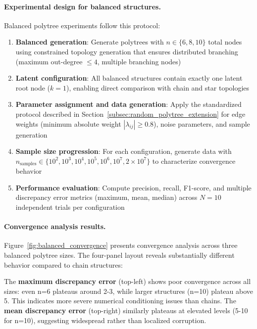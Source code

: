 \documentclass[11pt,a4paper]{article}
\numberwithin{equation}{section}
\begin{document}
\paragraph{Experimental design for balanced structures.} Balanced polytree experiments follow this protocol:

\begin{enumerate}[label=(\arabic*)]
\item \textbf{Balanced generation}: Generate polytrees with $n \in \{6, 8, 10\}$ total nodes using constrained topology generation that ensures distributed branching (maximum out-degree $\leq 4$, multiple branching nodes)

\item \textbf{Latent configuration}: All balanced structures contain exactly one latent root node ($k=1$), enabling direct comparison with chain and star topologies

\item \textbf{Parameter assignment and data generation}: Apply the standardized protocol described in Section~\ref{subsec:random_polytree_extension} for edge weights (minimum absolute weight $|\lambda_{ij}| \geq 0.8$), noise parameters, and sample generation

\item \textbf{Sample size progression}: For each configuration, generate data with $n_{\text{samples}} \in \{10^2, 10^3, 10^4, 10^5, 10^6, 10^7, 2 \times 10^7\}$ to characterize convergence behavior

\item \textbf{Performance evaluation}: Compute precision, recall, F1-score, and multiple discrepancy error metrics (maximum, mean, median) across $N = 10$ independent trials per configuration
\end{enumerate}

\paragraph{Convergence analysis results.} Figure~\ref{fig:balanced_convergence} presents convergence analysis across three balanced polytree sizes. The four-panel layout reveals substantially different behavior compared to chain structures:

The \textbf{maximum discrepancy error} (top-left) shows poor convergence across all sizes: even n=6 plateaus around 2-3, while larger structures (n=10) plateau above 5. This indicates more severe numerical conditioning issues than chains. The \textbf{mean discrepancy error} (top-right) similarly plateaus at elevated levels (5-10 for n=10), suggesting widespread rather than localized corruption.
\end{document}
